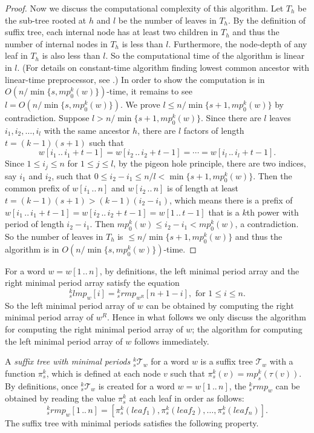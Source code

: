 \documentclass{article}
\def\subw#1#2#3{{#1[#2\,..\,#3]}}
\def\tree{\mathcal{T}}
\begin{document}
\begin{proof}
Now we discuss the computational complexity of this algorithm. Let
$T_h$ be the sub-tree rooted at $h$ and $l$ be the number of leaves
in $T_h$. By the definition of suffix tree, each internal node has
at least two children in $T_h$ and thus the number of internal nodes
in $T_h$ is less than $l$. Furthermore, the node-depth of any leaf
in $T_h$ is also less than $l$. So the computational time of the
algorithm is linear in $l$. (For details on constant-time algorithm
finding lowest common ancestor with linear-time preprocessor, see
\cite{Harel&Tarjan1984,Schieber&Vishkin1988}.) In order to show the
computation is in $O\left(n/\min\{s,mp_0^k(w)\}\right)$-time, it
remains to see $l=O\left(n/\min\{s,mp_0^k(w)\}\right)$. We prove
$l\leq n/\min\{s+1,mp_0^k(w)\}$ by contradiction. Suppose
$l>n/\min\{s+1,mp_0^k(w)\}$. Since there are $l$ leaves
$i_1,i_2,\ldots,i_l$ with the same ancestor $h$, there are $l$
factors of length $t=(k-1)(s+1)$ such that
  \[\subw{w}{i_1}{i_1+t-1}=\subw{w}{i_2}{i_2+t-1}=\cdots=\subw{w}{i_l}{i_l+t-1}.\]
Since $1\leq i_j\leq n$ for $1\leq j\leq l$, by the pigeon hole
principle, there are two indices, say $i_1$ and $i_2$, such that
$0\leq i_2-i_1\leq n/l<\min\{s+1,mp_0^k(w)\}$. Then the common
prefix of $\subw{w}{i_1}{n}$ and $\subw{w}{i_2}{n}$ is of length at
least $t=(k-1)(s+1)>(k-1)(i_2-i_1)$, which means there is a prefix
of $\subw{w}{i_1}{i_1+t-1}=\subw{w}{i_2}{i_2+t-1}=\subw{w}{1}{t-1}$
that is a $k$th power with period of length $i_2-i_1$. Then
$mp_0^k(w)\leq i_2-i_1<mp_0^k(w)$, a contradiction. So the number of
leaves in $T_h$ is $\leq n/\min\{s+1,mp_0^k(w)\}$ and thus the
algorithm is in $O\left(n/\min\{s,mp_0^k(w)\}\right)$-time.
\end{proof}


For a word $w=\subw{w}{1}{n}$, by definitions, the left minimal
period array and the right minimal period array satisfy the equation
  \[{}_s^klmp_w[i]={}_s^krmp_{w^R}[n+1-i],\textrm{ for }1\leq i\leq n.\]
So the left minimal period array of $w$ can be obtained by computing
the right minimal period array of $w^R$. Hence in what follows we only discuss the algorithm for computing
the right minimal period array of $w$; the algorithm for computing
the left minimal period array of $w$ follows immediately.


A \emph{suffix tree with minimal periods} ${}_s^k{\tree_w}$ for a
word $w$ is a suffix tree $\tree_w$ with a function $\pi_s^k$, which
is defined at each node $v$ such that $\pi_s^k(v)=mp_s^k(\tau(v))$.
By definitions, once ${}_s^k\tree_w$ is created for a word
$w=\subw{w}{1}{n}$, the ${}_s^krmp_w$ can be obtained by reading the
value $\pi_s^k$ at each leaf in order as follows:
  \[\subw{{}_s^krmp_w}{1}{n} = [\pi_s^k(leaf_1),\pi_s^k(leaf_2),\ldots,\pi_s^k(leaf_n)].\]
The suffix tree with minimal periods satisfies the following
property.
\end{document}
